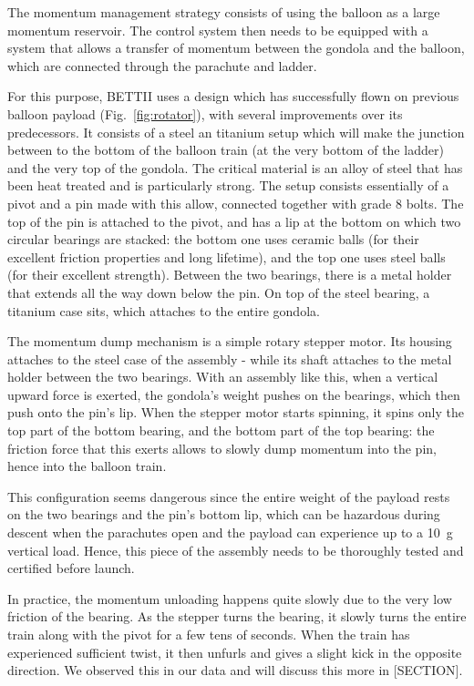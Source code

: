 The momentum management strategy consists of using the balloon as a large momentum reservoir. The control system then needs to be equipped with a system that allows a transfer of momentum between the gondola and the balloon, which are connected through the parachute and ladder. 

For this purpose, BETTII uses a design which has successfully flown on previous balloon payload (Fig.~\ref{fig:rotator}), with several improvements over its predecessors. It consists of a steel an titanium setup which will make the junction between to the bottom of the balloon train (at the very bottom of the ladder) and the very top of the gondola. The critical material is an alloy of steel that has been heat treated and is particularly strong. The setup consists essentially of a pivot and a pin made with this allow, connected together with grade 8 bolts. The top of the pin is attached to the pivot, and has a lip at the bottom on which two circular bearings are stacked: the bottom one uses ceramic balls (for their excellent friction properties and long lifetime), and the top one uses steel balls (for their excellent strength). Between the two bearings, there is a metal holder that extends all the way down below the pin. On top of the steel bearing, a titanium case sits, which attaches to the entire gondola. 

The momentum dump mechanism is a simple rotary stepper motor. Its housing attaches to the steel case of the assembly - while its shaft attaches to the metal holder between the two bearings. With an assembly like this, when a vertical upward force is exerted, the gondola's weight pushes on the bearings, which then push onto the pin's lip. When the stepper motor starts spinning, it spins only the top part of the bottom bearing, and the bottom part of the top bearing: the friction force that this exerts allows to slowly dump momentum into the pin, hence into the balloon train. 

This configuration seems dangerous since the entire weight of the payload rests on the two bearings and the pin's bottom lip, which can be hazardous during descent when the parachutes open and the payload can experience up to a 10~g vertical load. Hence, this piece of the assembly needs to be thoroughly tested and certified before launch. 

In practice, the momentum unloading happens quite slowly due to the very low friction of the bearing. As the stepper turns the bearing, it slowly turns the entire train along with the pivot for a few tens of seconds. When the train has experienced sufficient twist, it then unfurls and gives a slight kick in the opposite direction. We observed this in our data and will discuss this more in [SECTION].

